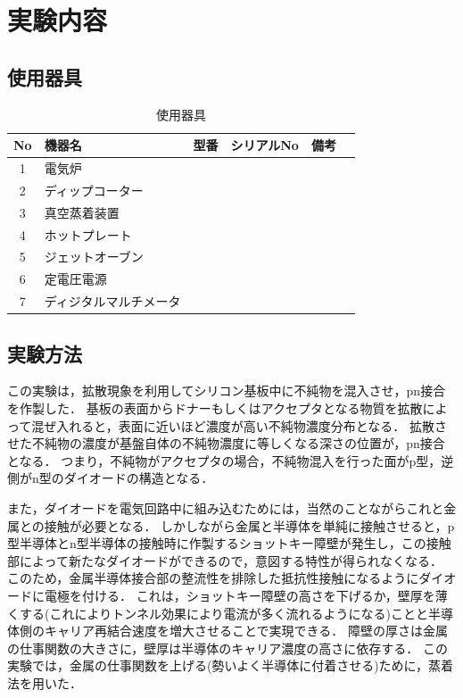\documentclass[11pt]{jarticle}
\begin{document}
\section{実験内容}
	\subsection{使用器具}
		\begin{table}[H]
		\begin{center}
		\caption{使用器具}
		\label{tab:used}
		\begin{tabular}{clllll} \toprule
		No&\multicolumn{1}{l}{機器名}&\multicolumn{1}{l}{型番}&\multicolumn{1}{l}{シリアルNo}&\multicolumn{1}{l}{備考}\\ \hline
		1&電気炉&&&\\
		2&ディップコーター&&&\\
		3&真空蒸着装置&&&\\
		4&ホットプレート&&&\\
		5&ジェットオーブン&&&\\
		6&定電圧電源&&&\\
		7&ディジタルマルチメータ&&&\\ \bottomrule
		\end{tabular}
		\end{center}
		\end{table}

	\subsection{実験方法}
		この実験は，拡散現象を利用してシリコン基板中に不純物を混入させ，pn接合を作製した．
		基板の表面からドナーもしくはアクセプタとなる物質を拡散によって混ぜ入れると，表面に近いほど濃度が高い不純物濃度分布となる．
		拡散させた不純物の濃度が基盤自体の不純物濃度に等しくなる深さの位置が，pn接合となる．
		つまり，不純物がアクセプタの場合，不純物混入を行った面がp型，逆側がn型のダイオードの構造となる．

		また，ダイオードを電気回路中に組み込むためには，当然のことながらこれと金属との接触が必要となる．
		しかしながら金属と半導体を単純に接触させると，p型半導体とn型半導体の接触時に作製するショットキー障壁が発生し，この接触部によって新たなダイオードができるので，意図する特性が得られなくなる．
		このため，金属半導体接合部の整流性を排除した抵抗性接触になるようにダイオードに電極を付ける．
		これは，ショットキー障壁の高さを下げるか，壁厚を薄くする(これによりトンネル効果により電流が多く流れるようになる)ことと半導体側のキャリア再結合速度を増大させることで実現できる．
		障壁の厚さは金属の仕事関数の大きさに，壁厚は半導体のキャリア濃度の高さに依存する．
		この実験では，金属の仕事関数を上げる(勢いよく半導体に付着させる)ために，蒸着法を用いた．
\end{document}
